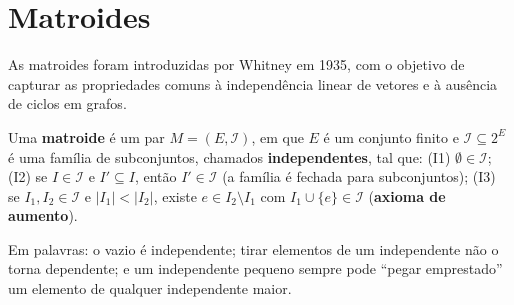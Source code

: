 \section{Matroides}\label{sec:matroides}
As matroides foram introduzidas por Whitney em 1935, com o objetivo de capturar as propriedades comuns à independência linear de vetores e à ausência de ciclos em grafos.
\begin{defi}[Matroide]
Uma \textbf{matroide} é um par $M=(E,\mathcal I)$, em que $E$ é um conjunto finito e $\mathcal I\subseteq2^E$ é uma família de subconjuntos, chamados \textbf{independentes}, tal que:
(I1) $\emptyset\in\mathcal I$;\quad
(I2) se $I\in\mathcal I$ e $I'\subseteq I$, então $I'\in\mathcal I$ (a família é fechada para subconjuntos);\quad
(I3) se $I_1,I_2\in\mathcal I$ e $|I_1|<|I_2|$, existe $e\in I_2\setminus I_1$ com $I_1\cup\{e\}\in\mathcal I$ (\textbf{axioma de aumento}).
\end{defi}
Em palavras: o vazio é independente; tirar elementos de um independente não o torna dependente; e um independente pequeno sempre pode ``pegar emprestado'' um elemento de qualquer independente maior.

